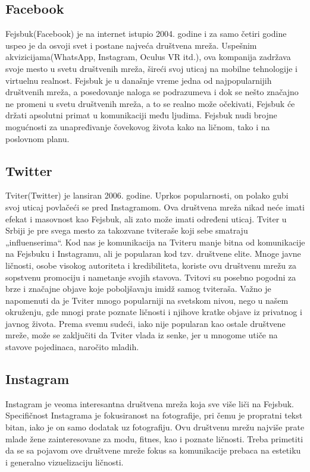 \documentclass[a4paper]{article}
\begin{document}
{		\subsection{Facebook}
		\label{subsec:podnaslov1}
		Fejsbuk(Facebook) je na internet istupio 2004. godine i za samo četiri godine uspeo je da osvoji svet i postane najveća društvena mreža. Uspešnim akvizicijama(WhatsApp, Instagram, Oculus VR itd.), ova kompanija zadržava svoje mesto u svetu društvenih mreža, šireći svoj uticaj na mobilne tehnologije i virtuelnu realnost. Fejsbuk je u današnje vreme jedna od najpopularnijih društvenih mreža, a posedovanje naloga se podrazumeva i dok se nešto značajno ne promeni u svetu društvenih mreža, a to se realno može očekivati, Fejsbuk će držati apsolutni primat u komunikaciji među ljudima. Fejsbuk nudi brojne mogućnosti za unapređivanje čovekovog života kako na ličnom, tako i na poslovnom planu.
		\subsection{Twitter}
		\label{subsec:podnaslov2}
		Tviter(Twitter) je lansiran 2006. godine. Uprkos popularnosti, on polako gubi svoj uticaj povlačeći se pred Instagramom. Ova društvena mreža nikad neće imati efekat i masovnost kao Fejsbuk, ali zato može imati određeni uticaj. Tviter u Srbiji je pre svega mesto za takozvane tviteraše koji sebe smatraju „influenserima“. Kod nas je komunikacija na Tviteru manje bitna od komunikacije na Fejsbuku i Instagramu, ali je popularan kod tzv. društvene elite. Mnoge javne ličnosti, osobe visokog autoriteta i kredibiliteta, koriste ovu društvenu mrežu za sopstvenu promociju i nametanje svojih stavova. Tvitovi su posebno pogodni za brze i značajne objave koje poboljšavaju imidž samog tviteraša. Važno je napomenuti da je Tviter mnogo popularniji na svetskom nivou, nego u našem okruženju, gde mnogi prate poznate ličnosti i njihove kratke objave iz privatnog i javnog života. Prema svemu sudeći, iako nije popularan kao ostale društvene mreže, može se zaključiti da Tviter vlada iz senke, jer u mnogome utiče na stavove pojedinaca, naročito mladih.
		\subsection{Instagram}
		\label{subsec:podnaslov3}
		Instagram je veoma interesantna društvena mreža koja sve više liči na Fejsbuk. Specifičnost Instagrama je fokusiranost na fotografije, pri čemu je propratni tekst bitan, iako je on samo dodatak uz fotografiju. Ovu društvenu mrežu najviše prate mlade žene zainteresovane za modu, fitnes, kao i poznate ličnosti. Treba primetiti da se sa pojavom ove društvene mreže fokus sa komunikacije prebaca na estetiku i generalno vizuelizaciju ličnosti.
}
\end{document}
